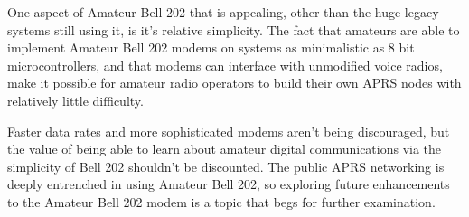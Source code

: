 One aspect of Amateur Bell 202 that is appealing, other than the 
huge legacy systems still using it, is it's relative simplicity.
The fact that amateurs are able to implement Amateur Bell 202 modems on
systems as minimalistic as 8 bit microcontrollers, and that modems can 
interface with unmodified voice radios,
make it possible for amateur radio operators to build their
own APRS nodes with relatively little difficulty.

Faster data rates and more sophisticated modems aren't being discouraged,
but the value of being able to learn about amateur digital communications 
via the simplicity of Bell 202 shouldn't be discounted.
The public APRS networking is deeply entrenched in using Amateur Bell 202,
so exploring future enhancements to the Amateur Bell 202 modem is a
topic that begs for further examination.

